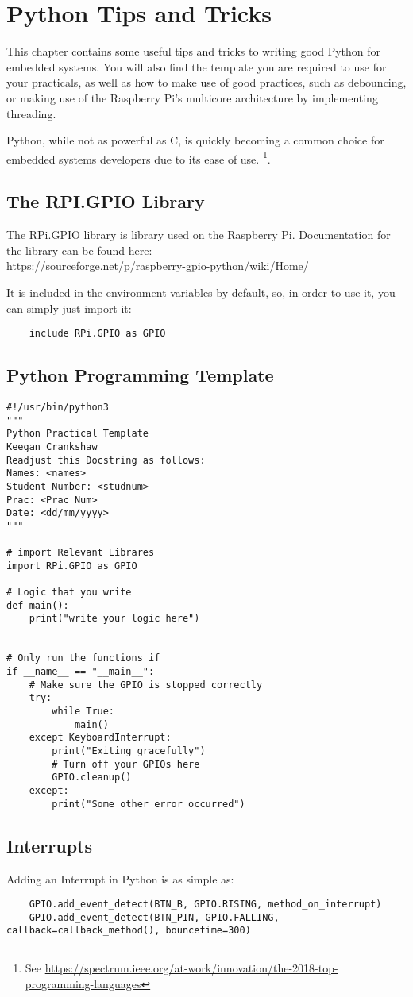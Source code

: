 \section{Python Tips and Tricks}
\label{app:Python}
This chapter contains some useful tips and tricks to writing good Python for embedded systems. You will also find the template you are required to use for your practicals, as well as how to make use of good practices, such as debouncing, or making use of the Raspberry Pi's multicore architecture by implementing threading.

Python, while not as powerful as C, is quickly becoming a common choice for embedded systems developers due to its ease of use. \footnote{See \href{https://spectrum.ieee.org/at-work/innovation/the-2018-top-programming-languages}{https://spectrum.ieee.org/at-work/innovation/the-2018-top-programming-languages}}. 

\subsection{The RPI.GPIO Library}
The RPi.GPIO library is library used on the Raspberry Pi. 
Documentation for the library can be found here:\\
\href{https://sourceforge.net/p/raspberry-gpio-python/wiki/Home/}{https://sourceforge.net/p/raspberry-gpio-python/wiki/Home/}

It is included in the environment variables by default, so, in order to use it, you can simply just import it:

\begin{verbatim}
    include RPi.GPIO as GPIO
\end{verbatim}

\subsection{Python Programming Template}
\begin{lstlisting}
#!/usr/bin/python3
"""
Python Practical Template
Keegan Crankshaw
Readjust this Docstring as follows:
Names: <names>
Student Number: <studnum>
Prac: <Prac Num>
Date: <dd/mm/yyyy>
"""

# import Relevant Librares
import RPi.GPIO as GPIO

# Logic that you write
def main():
    print("write your logic here")


# Only run the functions if 
if __name__ == "__main__":
	# Make sure the GPIO is stopped correctly
	try:
	    while True:
		    main()
	except KeyboardInterrupt:
		print("Exiting gracefully")
		# Turn off your GPIOs here
		GPIO.cleanup()
	except:
		print("Some other error occurred")

\end{lstlisting}

\subsection{Interrupts}
Adding an Interrupt in Python is as simple as:
\begin{verbatim}
    GPIO.add_event_detect(BTN_B, GPIO.RISING, method_on_interrupt)
    GPIO.add_event_detect(BTN_PIN, GPIO.FALLING, callback=callback_method(), bouncetime=300)  
\end{verbatim}

